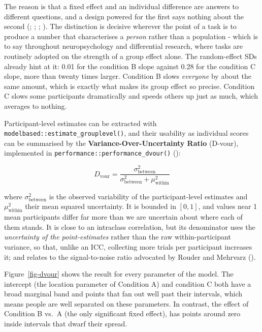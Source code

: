 \documentclass[
  jou,
  floatsintext,
  longtable,
  nolmodern,
  notxfonts,
  notimes,
  12pt,
  colorlinks=true,linkcolor=blue,citecolor=blue,urlcolor=blue]{apa7}
\begin{document}
The reason is that a fixed effect and an individual difference are
answers to different questions, and a design powered for the first says
nothing about the second (; ;
;
). The
distinction is decisive wherever the point of a task is to produce a
number that characterises a \emph{person} rather than a population -
which is to say throughout neuropsychology and differential research,
where tasks are routinely adopted on the strength of a group effect
alone. The random-effect SDs already hint at it: 0.01 for the condition
B slope against 0.28 for the condition C slope, more than twenty times
larger. Condition B slows \emph{everyone} by about the same amount,
which is exactly what makes its group effect so precise. Condition C
slows some participants dramatically and speeds others up just as much,
which averages to nothing.

Participant-level estimates can be extracted with
\texttt{modelbased::estimate\_grouplevel()}, and their usability as
individual scores can be summarised by the
\textbf{Variance-Over-Uncertainty Ratio} (D-vour), implemented in
\texttt{performance::performance\_dvour()}
():

\[
D_{\text{vour}} = \frac{\sigma_{\text{between}}^2}{\sigma_{\text{between}}^2 + \mu_{\text{within}}^2}
\]

where \(\sigma_{\text{between}}^2\) is the observed variability of the
participant-level estimates and \(\mu_{\text{within}}^2\) their mean
squared uncertainty. It is bounded in \([0, 1]\), and values near 1 mean
participants differ far more than we are uncertain about where each of
them stands. It is close to an intraclass correlation, but its
denominator uses the \emph{uncertainty of the point-estimates} rather
than the raw within-participant variance, so that, unlike an ICC,
collecting more trials per participant increases it; and relates to the
signal-to-noise ratio advocated by Rouder and Mehrvarz
().

Figure~\ref{fig-dvour} shows the result for every parameter of the
model. The intercept (the location parameter of Condition A) and
condition C both have a broad marginal band and points that fan out well
past their intervals, which means people are well separated on these
parameters. In contrast, the effect of Condition B vs.~A (the only
significant fixed effect), has points around zero inside intervals that
dwarf their spread.
\end{document}
